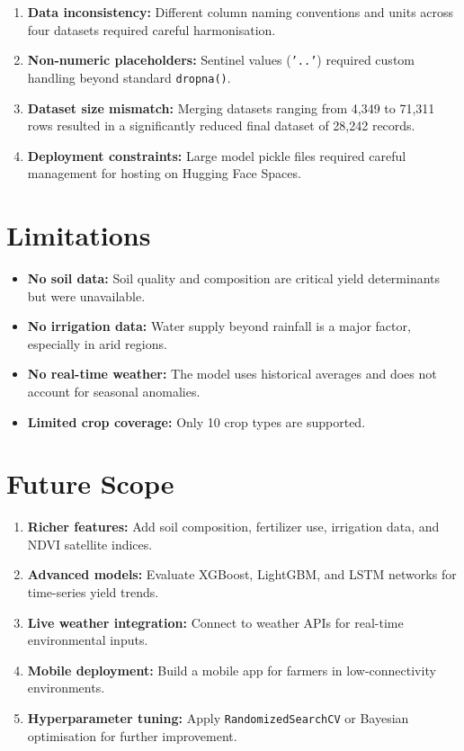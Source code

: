 \documentclass[12pt,a4paper]{article}
\begin{document}
\begin{enumerate}[label=\textbf{\arabic*.}, leftmargin=2.5em]
  \item \textbf{Data inconsistency:} Different column naming conventions and units
        across four datasets required careful harmonisation.
  \item \textbf{Non-numeric placeholders:} Sentinel values (\texttt{'..'}) required
        custom handling beyond standard \texttt{dropna()}.
  \item \textbf{Dataset size mismatch:} Merging datasets ranging from 4,349 to 71,311
        rows resulted in a significantly reduced final dataset of 28,242 records.
  \item \textbf{Deployment constraints:} Large model pickle files required careful
        management for hosting on Hugging Face Spaces.
\end{enumerate}

\section{Limitations}

\begin{itemize}[leftmargin=2em]
  \item \textbf{No soil data:} Soil quality and composition are critical yield
        determinants but were unavailable.
  \item \textbf{No irrigation data:} Water supply beyond rainfall is a major factor,
        especially in arid regions.
  \item \textbf{No real-time weather:} The model uses historical averages and does
        not account for seasonal anomalies.
  \item \textbf{Limited crop coverage:} Only 10 crop types are supported.
\end{itemize}

\section{Future Scope}

\begin{enumerate}[label=\textbf{\arabic*.}, leftmargin=2.5em]
  \item \textbf{Richer features:} Add soil composition, fertilizer use, irrigation
        data, and NDVI satellite indices.
  \item \textbf{Advanced models:} Evaluate XGBoost, LightGBM, and LSTM networks
        for time-series yield trends.
  \item \textbf{Live weather integration:} Connect to weather APIs for real-time
        environmental inputs.
  \item \textbf{Mobile deployment:} Build a mobile app for farmers in
        low-connectivity environments.
  \item \textbf{Hyperparameter tuning:} Apply \texttt{RandomizedSearchCV} or
        Bayesian optimisation for further improvement.
\end{enumerate}
\end{document}
